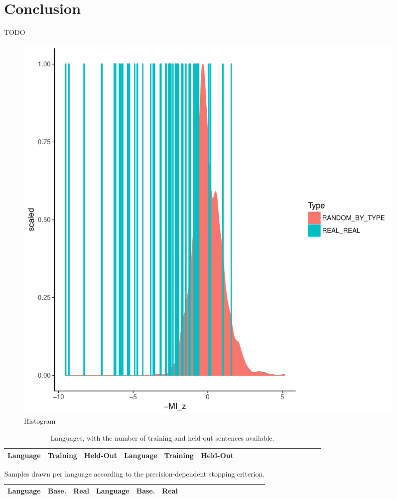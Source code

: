 \documentclass[11pt,letterpaper]{article}
\begin{document}
\section{Conclusion}

TODO





\appendix






\begin{figure}
\includegraphics[width=0.95\textwidth]{neural/figures/full-REAL-listener-surprisal-memory-HIST_z_byMem_onlyWordForms_boundedVocab.pdf}
\caption{Histogram}\label{fig:hist-real}
\end{figure}


\begin{table}
\begin{longtable}{l|ll||l|llllllllllllll}
	Language & Training & Held-Out & 	Language & Training & Held-Out\\ \hline

\end{longtable}
	\caption{Languages, with the number of training and held-out sentences available.}\label{tab:corpora}
\end{table}

\begin{table}
\begin{longtable}{l|ll||l|llllllllllllll}
	Language & Base. & Real & Language & Base. & Real \\ \hline

\end{longtable}
	\caption{Samples drawn per language according to the precision-dependent stopping criterion.}\label{tab:samples}
\end{table}
\end{document}
